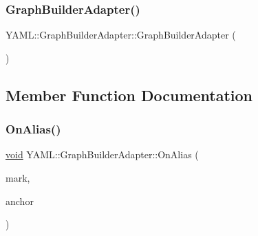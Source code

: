 \mbox{\label{class_y_a_m_l_1_1_graph_builder_adapter_a6440bb972418238961eff8c70c67a748}} 
\subsubsection{\texorpdfstring{GraphBuilderAdapter()}{GraphBuilderAdapter()}\hspace{0.1cm}{\footnotesize\ttfamily [3/3]}}
{\footnotesize\ttfamily Y\+A\+M\+L\+::\+Graph\+Builder\+Adapter\+::\+Graph\+Builder\+Adapter (\begin{DoxyParamCaption}\item[{\mbox{\hyperlink{class_y_a_m_l_1_1_graph_builder_adapter}{Graph\+Builder\+Adapter}} \&\&}]{ }\end{DoxyParamCaption})\hspace{0.3cm}{\ttfamily [delete]}}



\subsection{Member Function Documentation}
\mbox{\label{class_y_a_m_l_1_1_graph_builder_adapter_aa1563479f8a72f7182f0319637050eb5}} 
\subsubsection{\texorpdfstring{OnAlias()}{OnAlias()}}
{\footnotesize\ttfamily \mbox{\hyperlink{glad_8h_a950fc91edb4504f62f1c577bf4727c29}{void}} Y\+A\+M\+L\+::\+Graph\+Builder\+Adapter\+::\+On\+Alias (\begin{DoxyParamCaption}\item[{const \mbox{\hyperlink{struct_y_a_m_l_1_1_mark}{Mark}} \&}]{mark,  }\item[{\mbox{\hyperlink{namespace_y_a_m_l_abeff1798814ae3402fc5665fdcad1de6}{anchor\+\_\+t}}}]{anchor }\end{DoxyParamCaption})\hspace{0.3cm}{\ttfamily [virtual]}}



